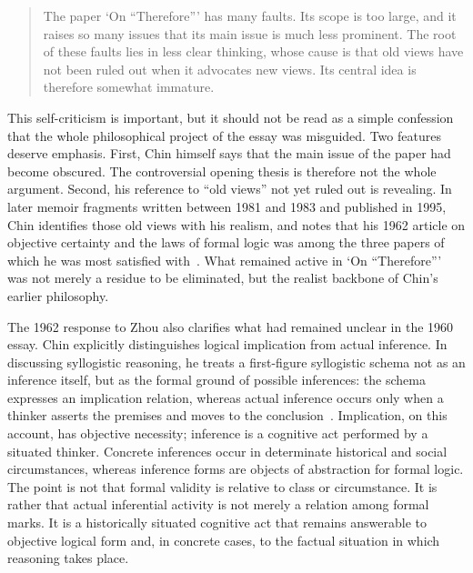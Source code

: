 \documentclass{birkjour}
\begin{document}
\begin{quote}
The paper `On ``Therefore''' has many faults. Its scope is too large, and it raises so many issues that its main issue is much less prominent. The root of these faults lies in less clear thinking, whose cause is that old views have not been ruled out when it advocates new views. Its central idea is therefore somewhat immature.~\cite{Jin1962}\cite[vol.~4, p.~555]{Jin2014}
\end{quote}

This self-criticism is important, but it should not be read as a simple confession that the whole philosophical project of the essay was misguided. Two features deserve emphasis. First, Chin himself says that the main issue of the paper had become obscured. The controversial opening thesis is therefore not the whole argument. Second, his reference to ``old views'' not yet ruled out is revealing. In later memoir fragments written between 1981 and 1983 and published in 1995, Chin identifies those old views with his realism, and notes that his 1962 article on objective certainty and the laws of formal logic was among the three papers of which he was most satisfied with~\cite[vol.~4, pp.~897--899]{Jin2014}. What remained active in `On ``Therefore''' was not merely a residue to be eliminated, but the realist backbone of Chin's earlier philosophy.

The 1962 response to Zhou also clarifies what had remained unclear in the 1960 essay. Chin explicitly distinguishes logical implication from actual inference. In discussing syllogistic reasoning, he treats a first-figure syllogistic schema not as an inference itself, but as the formal ground of possible inferences: the schema expresses an implication relation, whereas actual inference occurs only when a thinker asserts the premises and moves to the conclusion~\cite{Jin1962}. Implication, on this account, has objective necessity; inference is a cognitive act performed by a situated thinker. Concrete inferences occur in determinate historical and social circumstances, whereas inference forms are objects of abstraction for formal logic. The point is not that formal validity is relative to class or circumstance. It is rather that actual inferential activity is not merely a relation among formal marks. It is a historically situated cognitive act that remains answerable to objective logical form and, in concrete cases, to the factual situation in which reasoning takes place.
\end{document}
